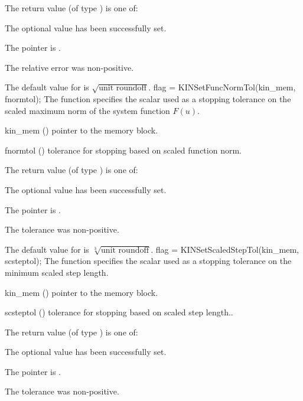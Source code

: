 {
  The return value  (of type ) is one of:
  \begin{args}
  \item[\Id{KIN\_SUCCESS}] 
    The optional value has been successfully set.
  \item[\Id{KIN\_MEM\_NULL}]
    The  pointer is .
  \item[\Id{KIN\_ILL\_INPUT}]
    The relative error was non-positive.
  \end{args}
}
{
  The default value for  is $\sqrt{\text{unit roundoff}}$.
}
{
flag = KINSetFuncNormTol(kin\_mem, fnormtol);
}
{
  The function  specifies the scalar used as a stopping
  tolerance on the scaled maximum norm of the system function $F(u)$.
}
{
  \begin{args}[fnormtol]
  \item[kin\_mem] ()
    pointer to the {\kinsol} memory block.
  \item[fnormtol] ()
    tolerance for stopping based on scaled function norm.
  \end{args}
}
{
  The return value  (of type ) is one of:
  \begin{args}
  \item[\Id{KIN\_SUCCESS}] 
    The optional value has been successfully set.
  \item[\Id{KIN\_MEM\_NULL}]
    The  pointer is .
  \item[\Id{KIN\_ILL\_INPUT}]
    The tolerance was non-positive.
  \end{args}
}
{
  The default value for  is $\sqrt[3]{\text{unit roundoff}}$.
}
{
flag = KINSetScaledStepTol(kin\_mem, scsteptol);
}
{
  The function  specifies the scalar used
  as a stopping tolerance on the minimum scaled step length.
}
{
  \begin{args}[scsteptol]
  \item[kin\_mem] ()
    pointer to the {\kinsol} memory block.
  \item[scsteptol] ()
    tolerance for stopping based on scaled step length.. 
  \end{args}
}
{
  The return value  (of type ) is one of:
  \begin{args}
  \item[\Id{KIN\_SUCCESS}] 
    The optional value has been successfully set.
  \item[\Id{KIN\_MEM\_NULL}]
    The  pointer is .
  \item[\Id{KIN\_ILL\_INPUT}]
    The tolerance was non-positive.
  \end{args}
}
